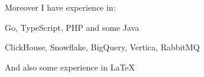 Moreover I have experience in:
\begin{bulist}
  \item Go, TypeScript, PHP and some Java
  \item ClickHouse, Snowflake, BigQuery, Vertica, RabbitMQ
\end{bulist}
And also some experience in \LaTeX


